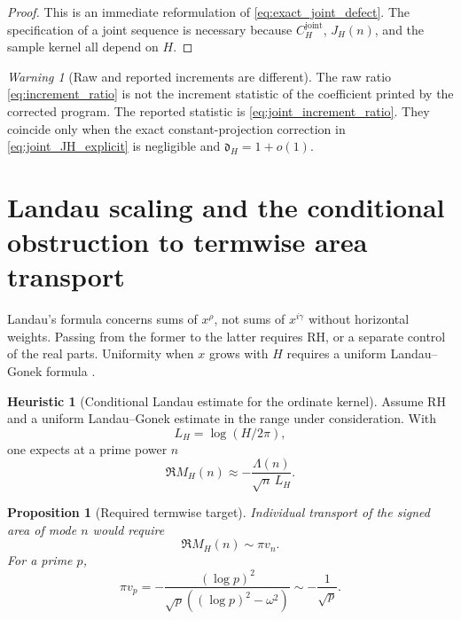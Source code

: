 \documentclass[11pt]{amsart}
\numberwithin{equation}{section}
\theoremstyle{plain}
\newtheorem{proposition}[theorem]{Proposition}
\theoremstyle{definition}
\newtheorem{heuristic}[theorem]{Heuristic}
\theoremstyle{remark}
\newtheorem{warning}[theorem]{Warning}
\newcommand{\RH}{\mathrm{RH}}
\newcommand{\1}{\mathbf{1}}
\begin{document}
\begin{proof}
This is an immediate reformulation of
\eqref{eq:exact_joint_defect}.  The specification of a joint sequence is
necessary because \(C_H^{\mathrm{joint}}\), \(J_H(n)\), and the sample
kernel all depend on \(H\).
\end{proof}

\begin{warning}[Raw and reported increments are different]
\label{warn:raw_joint_increment_difference}
The raw ratio \eqref{eq:increment_ratio} is not the increment statistic of
the coefficient printed by the corrected program.  The reported statistic
is \eqref{eq:joint_increment_ratio}.  They coincide only when the exact
constant-projection correction in \eqref{eq:joint_JH_explicit} is
negligible and \(\mathfrak d_H=1+o(1)\).
\end{warning}

\section{Landau scaling and the conditional obstruction to termwise area transport}
\label{sec:landau_scaling}

Landau's formula concerns sums of \(x^\rho\), not sums of \(x^{i\gamma}\)
without horizontal weights.  Passing from the former to the latter requires
\(\RH\), or a separate control of the real parts.  Uniformity when \(x\)
grows with \(H\) requires a uniform Landau--Gonek formula
\cite{Gonek1985,FordZaharescu2005}.

\begin{heuristic}[Conditional Landau estimate for the ordinate kernel]
\label{heur:landau_kernel}
Assume \(\RH\) and a uniform Landau--Gonek estimate in the range under
consideration.  With
\begin{equation}
L_H=\log(H/2\pi),
\label{eq:LH_definition}
\end{equation}
one expects at a prime power \(n\)
\begin{equation}
\Re M_H(n)
\approx
-\frac{\Lambda(n)}{\sqrt n\,L_H}.
\label{eq:MH_landau_heuristic}
\end{equation}
\end{heuristic}

\begin{proposition}[Required termwise target]
\label{prop:termwise_target}
Individual transport of the signed area of mode \(n\) would require
\begin{equation}
\Re M_H(n)\sim\pi v_n.
\label{eq:termwise_target}
\end{equation}
For a prime \(p\),
\begin{equation}
\pi v_p
=
-\frac{(\log p)^2}
{\sqrt p((\log p)^2-\omega^2)}
\sim
-\frac1{\sqrt p}.
\label{eq:pi_vp_asymptotic}
\end{equation}
\end{proposition}
\end{document}
